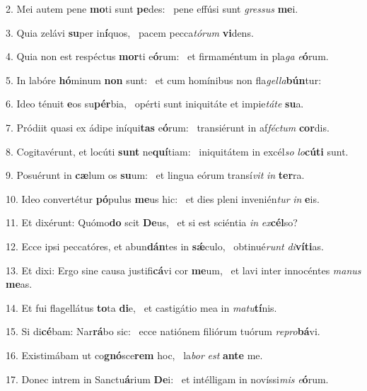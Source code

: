 2. Mei autem pene \textbf{mo}ti sunt \textbf{pe}des: \ast\  pene effúsi sunt \textit{gres}\textit{sus} \textbf{me}i.\

3. Quia zelávi \textbf{su}per in\textbf{í}quos, \ast\  pacem pecca\textit{tó}\textit{rum} \textbf{vi}dens.\

4. Quia non est respéctus \textbf{mor}ti e\textbf{ó}rum: \ast\  et firmaméntum in pla\textit{ga} \textit{e}\textbf{ó}rum.\

5. In labóre \textbf{hó}minum \textbf{non} sunt: \ast\  et cum homínibus non fla\textit{gel}\textit{la}\textbf{bún}tur:\

6. Ideo ténuit \textbf{e}os su\textbf{pér}bia, \ast\  opérti sunt iniquitáte et impie\textit{tá}\textit{te} \textbf{su}a.\

7. Pródiit quasi ex ádipe iníqui\textbf{tas} e\textbf{ó}rum: \ast\  transiérunt in af\textit{féc}\textit{tum} \textbf{cor}dis.\

8. Cogitavérunt, et locúti \textbf{sunt} ne\textbf{quí}tiam: \ast\  iniquitátem in excél\textit{so} \textit{lo}\textbf{cú}\textbf{ti} sunt.\

9. Posuérunt in \textbf{cæ}lum os \textbf{su}um: \ast\  et lingua eórum transí\textit{vit} \textit{in} \textbf{ter}ra.\

10. Ideo convertétur \textbf{pó}pulus \textbf{me}us hic: \ast\  et dies pleni invenién\textit{tur} \textit{in} \textbf{e}is.\

11. Et dixérunt: Quómo\textbf{do} scit \textbf{De}us, \ast\  et si est sciéntia \textit{in} \textit{ex}\textbf{cél}so?\

12. Ecce ipsi peccatóres, et abun\textbf{dán}tes in \textbf{sǽ}culo, \ast\  obtinué\textit{runt} \textit{di}\textbf{ví}\textbf{ti}as.\

13. Et dixi: Ergo sine causa justifi\textbf{cá}vi cor \textbf{me}um, \ast\  et lavi inter innocéntes \textit{ma}\textit{nus} \textbf{me}as.\

14. Et fui flagellátus \textbf{to}ta \textbf{di}e, \ast\  et castigátio mea in \textit{ma}\textit{tu}\textbf{tí}nis.\

15. Si di\textbf{cé}bam: Nar\textbf{rá}bo sic: \ast\  ecce natiónem filiórum tuórum \textit{re}\textit{pro}\textbf{bá}vi.\

16. Existimábam ut co\textbf{gnó}sce\textbf{rem} hoc, \ast\  la\textit{bor} \textit{est} \textbf{an}\textbf{te} me.\

17. Donec intrem in Sanctu\textbf{á}rium \textbf{De}i: \ast\  et intélligam in novíssi\textit{mis} \textit{e}\textbf{ó}rum.\

